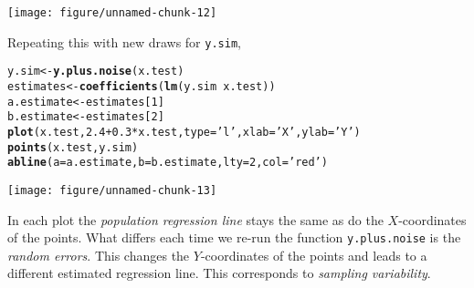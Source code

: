 \documentclass[addpoints,12pt]{exam}\usepackage[]{graphicx}\usepackage[]{color}
\makeatletter
\def\maxwidth{ %
  \ifdim\Gin@nat@width>\linewidth
    \linewidth
  \else
    \Gin@nat@width
  \fi
}
\newcommand{\hlnum}[1]{\textcolor[rgb]{0.686,0.059,0.569}{#1}}%
\newcommand{\hlstr}[1]{\textcolor[rgb]{0.192,0.494,0.8}{#1}}%
\newcommand{\hlopt}[1]{\textcolor[rgb]{0,0,0}{#1}}%
\newcommand{\hlstd}[1]{\textcolor[rgb]{0.345,0.345,0.345}{#1}}%
\newcommand{\hlkwb}[1]{\textcolor[rgb]{0.69,0.353,0.396}{#1}}%
\newcommand{\hlkwc}[1]{\textcolor[rgb]{0.333,0.667,0.333}{#1}}%
\newcommand{\hlkwd}[1]{\textcolor[rgb]{0.737,0.353,0.396}{\textbf{#1}}}%
\newenvironment{kframe}{%
 \def\at@end@of@kframe{}%
 \ifinner\ifhmode%
  \def\at@end@of@kframe{\end{minipage}}%
  \begin{minipage}{\columnwidth}%
 \fi\fi%
 \def\FrameCommand##1{\hskip\@totalleftmargin \hskip-\fboxsep
 \colorbox{shadecolor}{##1}\hskip-\fboxsep
     \hskip-\linewidth \hskip-\@totalleftmargin \hskip\columnwidth}%
 \MakeFramed {\advance\hsize-\width
   \@totalleftmargin\z@ \linewidth\hsize
   \@setminipage}}%
 {\par\unskip\endMakeFramed%
 \at@end@of@kframe}
\newenvironment{knitrout}{}{} %
\makeatother
\begin{document}
\begin{questions}
\begin{parts}
\begin{solution}
\begin{knitrout}
{\centering \texttt{[image: figure/unnamed-chunk-12]} 

}



\end{knitrout}
Repeating this with new draws for \texttt{y.sim}, 
\begin{knitrout}
\color{fgcolor}\begin{kframe}
\begin{alltt}
\hlstd{y.sim} \hlkwb{<-} \hlkwd{y.plus.noise}\hlstd{(x.test)}
\hlstd{estimates} \hlkwb{<-} \hlkwd{coefficients}\hlstd{(}\hlkwd{lm}\hlstd{(y.sim} \hlopt{~} \hlstd{x.test))}
\hlstd{a.estimate} \hlkwb{<-} \hlstd{estimates[}\hlnum{1}\hlstd{]}
\hlstd{b.estimate} \hlkwb{<-} \hlstd{estimates[}\hlnum{2}\hlstd{]}
\hlkwd{plot}\hlstd{(x.test,} \hlnum{2.4} \hlopt{+} \hlnum{0.3} \hlopt{*} \hlstd{x.test,} \hlkwc{type} \hlstd{=} \hlstr{'l'}\hlstd{,} \hlkwc{xlab} \hlstd{=} \hlstr{'X'}\hlstd{,} \hlkwc{ylab} \hlstd{=} \hlstr{'Y'}\hlstd{)}
\hlkwd{points}\hlstd{(x.test, y.sim)}
\hlkwd{abline}\hlstd{(}\hlkwc{a} \hlstd{= a.estimate,} \hlkwc{b} \hlstd{= b.estimate,} \hlkwc{lty} \hlstd{=} \hlnum{2}\hlstd{,} \hlkwc{col} \hlstd{=} \hlstr{'red'}\hlstd{)}
\end{alltt}
\end{kframe}

{\centering \texttt{[image: figure/unnamed-chunk-13]} 

}



\end{knitrout}
In each plot the \emph{population regression line} stays the same as do the $X$-coordinates of the points. What differs each time we re-run the function \texttt{y.plus.noise} is the \emph{random errors}. This changes the $Y$-coordinates of the points and leads to a different estimated regression line. This corresponds to \emph{sampling variability}.
  \end{solution}

\end{parts}
\end{questions}
\end{document}
